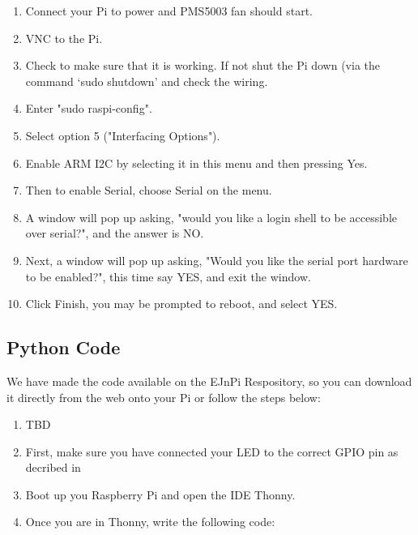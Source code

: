 \documentclass{article}
\begin{document}
\begin{enumerate}
  \item Connect your Pi to power and PMS5003 fan should start.
  \item VNC to the Pi.
  \item Check to make sure that it is working. If not shut the Pi down (via the command `sudo shutdown' and check the wiring. 

\item Enter "sudo raspi-config".

\item Select option 5 ("Interfacing Options").

\item Enable ARM I2C by selecting it in this menu and then pressing Yes.

\item Then to enable Serial, choose Serial on the menu. 

\item A window will pop up asking, "would you like a login shell to be accessible over serial?", and the answer is NO.

\item Next, a window will pop up asking, "Would you like the serial port hardware to be enabled?", this time say YES, and exit the window.

\item Click Finish, you may be prompted to reboot, and select YES.

\end{enumerate}

\subsection{Python Code}

We have made the code available on the EJnPi Respository, so you can download it directly from the web onto your Pi or follow the steps below:

\begin{enumerate}

\item TBD

\item First, make sure you have connected your LED to the correct GPIO pin as decribed in %
\item Boot up you Raspberry Pi and open the IDE Thonny.
\item Once you are in Thonny, write the following code: \newline


\end{enumerate}
\end{document}
